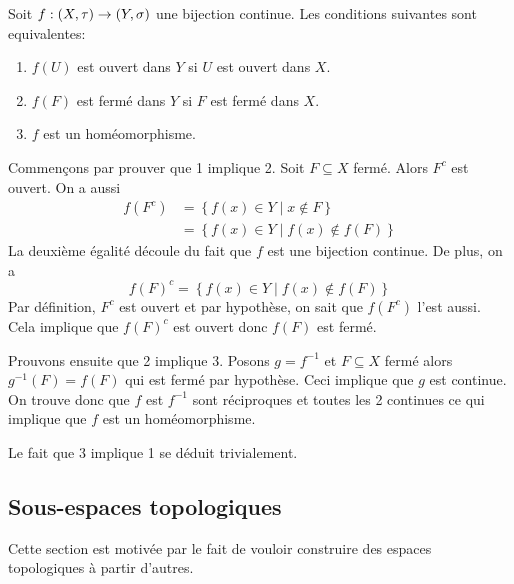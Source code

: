 \documentclass[french]{article}
\begin{document}
\begin{theoreme}
  Soit $f: (X, \tau) \rightarrow (Y, \sigma)$ une bijection continue. Les conditions suivantes sont equivalentes:
  \begin{enumerate}
    \item $f(U)$ est ouvert dans  $Y$ si $U$ est ouvert dans $X$.
    \item  $f(F)$ est fermé dans $Y$ si $F$ est fermé dans $X$.
    \item $f$ est un homéomorphisme.
  \end{enumerate}

  \tcblower
  \begin{preuve}
    Commençons par prouver que 1 implique 2. Soit $F \subseteq X$ fermé. Alors $F^{c}$ est ouvert. On a aussi
    \begin{align*}
      f(F^{c}) &= \left\{ f(x) \in Y \mid x \not \in F \right\} \\
               &= \left\{ f(x) \in Y \mid f(x) \not \in f(F) \right\}
    \end{align*}
    La deuxième égalité découle du fait que $f$ est une bijection continue. De plus, on a
    $$f(F)^{c} = \left\{ f(x) \in Y \mid f(x) \not \in f(F) \right\}$$
    Par définition, $F^{c}$ est ouvert et par hypothèse, on sait que $f(F^{c})$ l'est aussi. Cela implique que $f(F)^{c}$ est ouvert donc $f(F)$ est fermé.
    \par Prouvons ensuite que 2 implique 3. Posons $g = f^{-1}$ et $F \subseteq X$ fermé alors $g^{-1}(F) = f(F)$ qui est fermé par hypothèse. Ceci implique que $g$ est continue. On trouve donc que $f$ est $f^{-1}$ sont réciproques et toutes les 2 continues ce qui implique que $f$ est un homéomorphisme.
    \par Le fait que 3 implique 1 se déduit trivialement.
  \end{preuve}
\end{theoreme}

\subsection{Sous-espaces topologiques}
Cette section est motivée par le fait de vouloir construire des espaces topologiques à partir d'autres.
\end{document}
